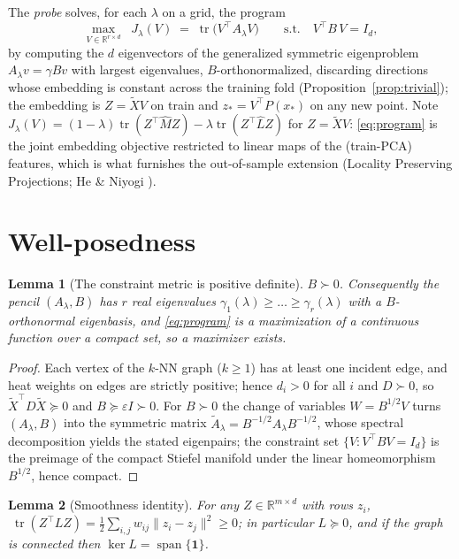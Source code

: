 \documentclass[11pt]{article}
\newtheorem{lemma}{Lemma}
\theoremstyle{remark}
\newcommand{\R}{\mathbb{R}}
\newcommand{\tr}{\operatorname{tr}}
\newcommand{\Xt}{\widetilde{X}}
\newcommand{\Mh}{\widehat{M}}
\newcommand{\Lh}{\widehat{L}}
\begin{document}
The \emph{probe} solves, for each $\lambda$ on a grid, the program
\begin{equation}\label{eq:program}
\max_{V\in\R^{r\times d}}\;\; J_\lambda(V) \;=\; \tr\!\big(V^{\!\top} A_\lambda V\big)
\qquad\text{s.t.}\quad V^{\!\top} B\, V = I_d ,
\end{equation}
by computing the $d$ eigenvectors of the generalized symmetric eigenproblem
$A_\lambda v=\gamma B v$ with largest eigenvalues, $B$-orthonormalized, discarding
directions whose embedding is constant across the training fold (Proposition~\ref{prop:trivial});
the embedding is $Z=\Xt V$ on train and $z_\ast=V^{\!\top}P(x_\ast)$ on any new point.
Note $J_\lambda(V) = (1-\lambda)\tr(Z^{\!\top}\Mh Z)-\lambda\tr(Z^{\!\top}\Lh Z)$ for
$Z = \Xt V$: \eqref{eq:program} is the joint embedding objective restricted to linear
maps of the (train-PCA) features, which is what furnishes the out-of-sample extension
(Locality Preserving Projections; He \& Niyogi \cite{he2003lpp}).

\section{Well-posedness}

\begin{lemma}[The constraint metric is positive definite]\label{lem:pd}
$B\succ 0$. Consequently the pencil $(A_\lambda,B)$ has $r$ real eigenvalues
$\gamma_1(\lambda)\ge\dots\ge\gamma_r(\lambda)$ with a $B$-orthonormal eigenbasis, and
\eqref{eq:program} is a maximization of a continuous function over a compact set, so a
maximizer exists.
\end{lemma}

\begin{proof}
Each vertex of the $k$-NN graph ($k\ge1$) has at least one incident edge, and heat
weights on edges are strictly positive; hence $d_i>0$ for all $i$ and $D\succ0$, so
$\Xt^{\!\top}D\Xt\succeq0$ and $B\succeq\varepsilon I\succ0$. For $B\succ0$ the change of
variables $W=B^{1/2}V$ turns $(A_\lambda,B)$ into the symmetric matrix
$\tilde A_\lambda = B^{-1/2}A_\lambda B^{-1/2}$, whose spectral decomposition yields the
stated eigenpairs; the constraint set $\{V:V^{\!\top}BV=I_d\}$ is the preimage of the
compact Stiefel manifold under the linear homeomorphism $B^{1/2}$, hence compact.
\end{proof}

\begin{lemma}[Smoothness identity]\label{lem:dirichlet}
For any $Z\in\R^{m\times d}$ with rows $z_i$,
$\;\tr(Z^{\!\top}LZ)=\tfrac12\sum_{i,j} w_{ij}\|z_i-z_j\|^2\ge 0$; in particular
$L\succeq0$, and if the graph is connected then $\ker L=\operatorname{span}\{\mathbf 1\}$.
\end{lemma}
\end{document}
